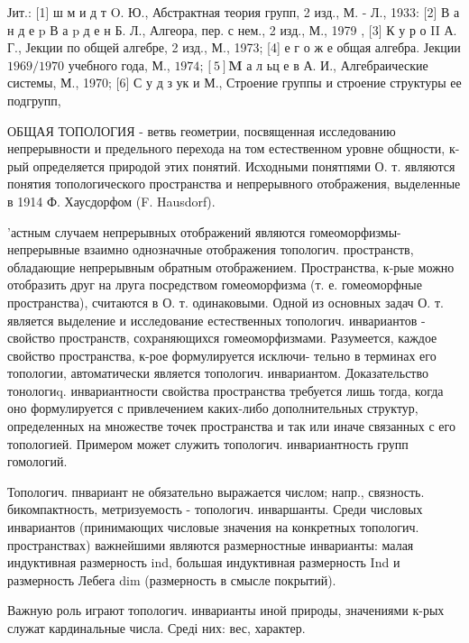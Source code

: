 \documentclass[10pt]{article}
\begin{document}
Јит.: [1] ш м и д т $\mathrm{O}$. Ю., Абстрактная теория групп, 2 изд., М. - Л., 1933: [2] В а н д е p В а p д е н Б. Л., Алгеора, пер. с нем., 2 изд., М., 1979 , [3] К у р о II А. Г., Јекции по общей алгебре, 2 изд., М., 1973; [4] е г о ж е общая алгебра. Јекции $1969 / 1970$ учебного года, М., $1974 ;[5] \mathbf{M}$ а л ьц е в А. И., Алгебраические системы, М., 1970; [6] С у д з ук и М., Строение группы и строение структуры ее подгрупп,



ОБЩАЯ ТОПОЛОГИЯ - ветвь геометрии, посвященная исследованию непрерывности и предельного перехода на том естественном уровне общности, к-рый определяется природой этих понятий. Исходными понятпями О. т. являются понятия топологического пространства и непрерывного отображения, выделенные в 1914 Ф. Хаусдорфом (F. Hausdorf).



'астным случаем непрерывных отображений являются гомеоморфизмы- непрерывные взаимно однозначные отображения топологич. пространств, обладающие непрерывным обратным отображением. Пространства, к-рые можно отобразить друг на лруга посредством гомеоморфизма (т. е. гомеоморфные пространства), считаются в О. т. одинаковыми. Одной из основных задач О. т. является выделение и исследование естественных топологич. инвариантов - свойство пространств, сохраняющихся гомеоморфизмами. Разумеется, каждое свойство пространства, к-рое формулируется исключи- тельно в терминах его топологии, автоматически является топологич. инвариантом. Доказательство тонологиq. инвариантности свойства пространства требуется лишь тогда, когда оно формулируется с привлечением каких-либо дополнительных структур, определенных на множестве точек пространства и так или иначе связанных с его топологией. Примером может служить топологич. инвариантность групп гомологий.



Топологич. пнвариант не обязательно выражается числом; напр., связность. бикомпактность, метризуемость - топологич. инваршанты. Среди числовых инвариантов (принимающих числовые значения на конкретных топологич. пространствах) важнейшими являются размерностные инварианты: малая индуктивная размерность ind, большая индуктивная размерность Ind и размерность Лебега dim (размерность в смысле покрытий).



Важную роль играют топологич. инварианты иной природы, значениями к-рых служат кардинальные числа. Среді них: вес, характер.
\end{document}
